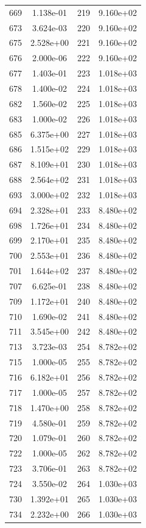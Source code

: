 \documentclass[12pt]{article}
\begin{document}
\begin{longtable}{@{}cccc@{}}
669 & 1.138e-01 & 219 & 9.160e+02 \\
673 & 3.624e-03 & 220 & 9.160e+02 \\
675 & 2.528e+00 & 221 & 9.160e+02 \\
676 & 2.000e-06 & 222 & 9.160e+02 \\
677 & 1.403e-01 & 223 & 1.018e+03 \\
678 & 1.400e-02 & 224 & 1.018e+03 \\
682 & 1.560e-02 & 225 & 1.018e+03 \\
683 & 1.000e-02 & 226 & 1.018e+03 \\
685 & 6.375e+00 & 227 & 1.018e+03 \\
686 & 1.515e+02 & 229 & 1.018e+03 \\
687 & 8.109e+01 & 230 & 1.018e+03 \\
688 & 2.564e+02 & 231 & 1.018e+03 \\
693 & 3.000e+02 & 232 & 1.018e+03 \\
694 & 2.328e+01 & 233 & 8.480e+02 \\
698 & 1.726e+01 & 234 & 8.480e+02 \\
699 & 2.170e+01 & 235 & 8.480e+02 \\
700 & 2.553e+01 & 236 & 8.480e+02 \\
701 & 1.644e+02 & 237 & 8.480e+02 \\
707 & 6.625e-01 & 238 & 8.480e+02 \\
709 & 1.172e+01 & 240 & 8.480e+02 \\
710 & 1.690e-02 & 241 & 8.480e+02 \\
711 & 3.545e+00 & 242 & 8.480e+02 \\
713 & 3.723e-03 & 254 & 8.782e+02 \\
715 & 1.000e-05 & 255 & 8.782e+02 \\
716 & 6.182e+01 & 256 & 8.782e+02 \\
717 & 1.000e-05 & 257 & 8.782e+02 \\
718 & 1.470e+00 & 258 & 8.782e+02 \\
719 & 4.580e-01 & 259 & 8.782e+02 \\
720 & 1.079e-01 & 260 & 8.782e+02 \\
722 & 1.000e-05 & 262 & 8.782e+02 \\
723 & 3.706e-01 & 263 & 8.782e+02 \\
724 & 3.550e-02 & 264 & 1.030e+03 \\
730 & 1.392e+01 & 265 & 1.030e+03 \\
734 & 2.232e+00 & 266 & 1.030e+03 \\

\end{longtable}
\end{document}
